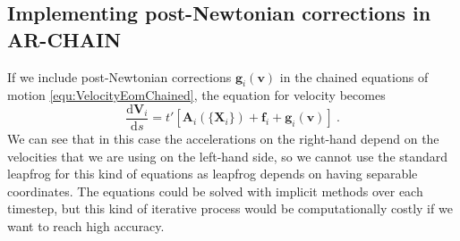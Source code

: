 \documentclass[english, oneside]{HYgradu}
\begin{document}
\subsection{Implementing post-Newtonian corrections in AR-CHAIN}

If we include post-Newtonian corrections $\boldsymbol{g}_i(\mathbf{v})$ in the chained equations of motion \ref{equ:VelocityEomChained}, the equation for velocity becomes
\begin{equation}
\frac{\mathrm{d}\boldsymbol{V}_i}{\mathrm{d}s} = t' [ \boldsymbol{A}_i(\{ \boldsymbol{X}_i \}) + \boldsymbol{f}_i + \boldsymbol{g}_i(\mathbf{v})] \ .
\end{equation}
We can see that in this case the accelerations on the right-hand depend on the velocities that we are using on the left-hand side, so we cannot use the standard leapfrog for this kind of equations as leapfrog depends on having separable coordinates. The equations could be solved with implicit methods over each timestep, but this kind of iterative process would be computationally costly if we want to reach high accuracy.
\end{document}
